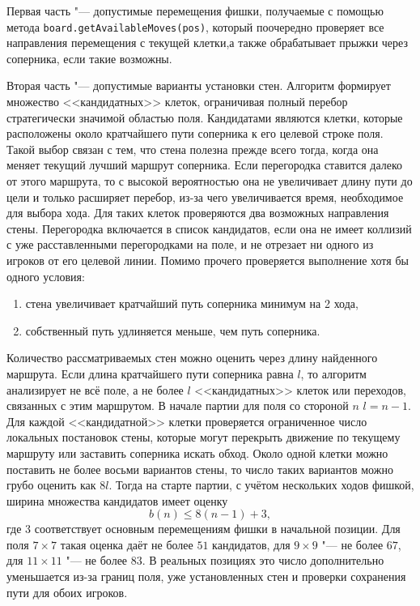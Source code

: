\documentclass[a4paper,12pt]{diplom}
\renewcommand{\leq}{\leqslant}
\begin{document}
Первая часть "--- допустимые перемещения фишки, получаемые с помощью метода \texttt{board.getAvailableMoves(pos)}, который поочередно проверяет все направления перемещения с текущей клетки,а также обрабатывает прыжки через соперника, если такие возможны.

Вторая часть "--- допустимые варианты установки стен. Алгоритм формирует множество <<кандидатных>> клеток, ограничивая полный перебор стратегически значимой областью поля. Кандидатами являются клетки, которые расположены около кратчайшего пути соперника к его целевой строке поля. Такой выбор связан с тем, что стена полезна прежде всего тогда, когда она меняет текущий лучший маршрут соперника. Если перегородка ставится далеко от этого маршрута, то с высокой вероятностью она не увеличивает длину пути до цели и только расширяет перебор, из-за чего увеличивается время, необходимое для выбора хода. Для таких клеток проверяются два возможных направления стены. Перегородка включается в список кандидатов, если она не имеет коллизий с уже расставленными перегородками на поле, и не отрезает ни одного из игроков от его целевой линии. Помимо прочего проверяется выполнение хотя бы одного условия:
\begin{enumerate}
    \item стена увеличивает кратчайший путь соперника минимум на 2 хода,
    \item собственный путь удлиняется меньше, чем путь соперника.
\end{enumerate}

Количество рассматриваемых стен можно оценить через длину найденного маршрута. Если длина кратчайшего пути соперника равна $l$, то алгоритм анализирует не всё поле, а не более $l$ <<кандидатных>> клеток или переходов, связанных с этим маршрутом. В начале партии для поля со стороной $n$ $l = n-1$. Для каждой <<кандидатной>> клетки проверяется ограниченное число локальных постановок стены, которые могут перекрыть движение по текущему маршруту или заставить соперника искать обход. Около одной клетки можно поставить не более восьми вариантов стены, то число таких вариантов можно грубо оценить как $8l$. Тогда на старте партии, с учётом нескольких ходов фишкой, ширина множества кандидатов имеет оценку
\[
    b(n) \leq 8(n-1) + 3,
\]
где $3$ соответствует основным перемещениям фишки в начальной позиции. Для поля $7 \times 7$ такая оценка даёт не более $51$ кандидатов, для $9 \times 9$ "--- не более $67$, для $11 \times 11$ "--- не более $83$. В реальных позициях это число дополнительно уменьшается из-за границ поля, уже установленных стен и проверки сохранения пути для обоих игроков.
\end{document}
